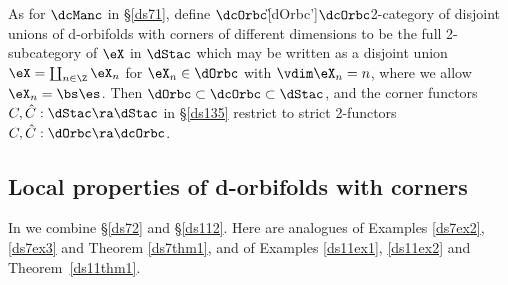 \documentclass{article}
\begin{document}
\begin{dfn} As for $\dcManc$ in \S\ref{ds71}, define
$\dcOrbc$\G[dOrbc']{$\dcOrbc$}{2-category of disjoint unions of
d-orbifolds with corners of different dimensions} to be the full
2-sub\-cat\-eg\-ory of $\eX$ in $\dStac$ which may be written as a
disjoint union $\eX=\coprod_{n\in\Z}\eX_n$ for $\eX_n\in\dOrbc$ with
$\vdim\eX_n=n$, where we allow $\eX_n=\bs\es$. Then
$\dOrbc\subset\dcOrbc\subset\dStac$, and the corner functors $C,\hat
C:\dStac\ra\dStac$ in
\S\ref{ds135} restrict to strict 2-functors~$C,\hat
C:\dOrbc\ra\dcOrbc$.
\label{ds14def2}
\end{dfn}

\subsection{Local properties of d-orbifolds with corners}
\label{ds142}

In \cite[\S 12.2]{Joyc6} we combine \S\ref{ds72} and \S\ref{ds112}.
Here are analogues of Examples \ref{ds7ex2}, \ref{ds7ex3} and
Theorem \ref{ds7thm1}, and of Examples \ref{ds11ex1}, \ref{ds11ex2}
and Theorem~\ref{ds11thm1}.
\end{document}
